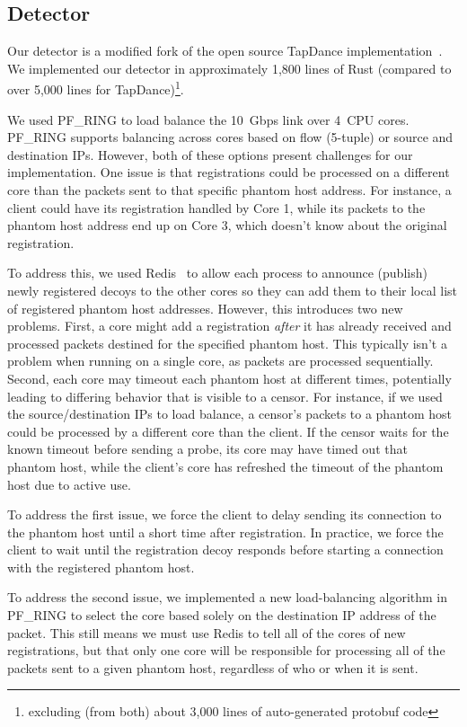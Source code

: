 \documentclass[letterpaper,twocolumn,10pt]{article}
\begin{document}
\FigImplementation

\subsection{Detector}

Our detector is a modified fork of the open source TapDance
implementation~\cite{tapdance-source}.
We implemented our detector in approximately 1,800 lines of Rust (compared to
over 5,000 lines for TapDance)\footnote{excluding (from both) about 3,000 lines
of auto-generated protobuf code}.

We used PF\_RING to load balance the 10~Gbps link over 4~CPU cores. PF\_RING
supports balancing across cores based on flow (5-tuple) or source and
destination IPs. However, both of these options present challenges for our 
implementation. One issue is that registrations could be processed on a
different core than the packets sent to that specific phantom host address. For
instance, a client could have its registration handled by Core 1, while its
packets to the phantom host address end up on Core 3, which doesn't know about the
original registration.

To address this, we used Redis~\cite{redis} to allow each process to announce
(publish) newly registered decoys to the other cores so they can
add them to their local list of registered phantom host addresses.
However, this introduces two new problems. First, a core might add a
registration \emph{after} it has already received and processed packets destined
for the specified phantom host. This typically isn't a problem when running on a
single core, as packets are processed sequentially. Second, each core may
timeout each phantom host at different times, potentially leading to differing
behavior that is visible to a censor. For instance, if we used the
source/destination IPs to load balance, a censor's packets to a phantom host could
be processed by a different core than the client. If the censor waits for the
known timeout before sending a probe, its core may have timed out that phantom host, while the client's core has refreshed the timeout of the phantom host due
to active use.

To address the first issue, we force the client to delay sending its connection
to the phantom host until a short time after registration. In practice, we force
the client to wait until the registration decoy responds before starting a
connection with the registered phantom host.

To address the second issue, we implemented a new load-balancing algorithm in
PF\_RING to select the core based solely on the destination IP address of the
packet. This still means we must use Redis to tell all of the cores of new
registrations, but that only one core will be responsible for processing all of
the packets sent to a given phantom host, regardless of who or when it is sent.
\end{document}
